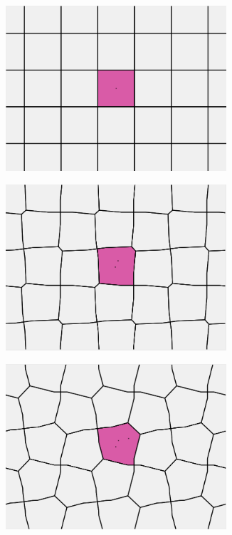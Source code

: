 \documentclass[12pt]{article}
\begin{document}
\begin{figure}[h]

  \begin{subfigure}[b]{0.323\textwidth}
    \includegraphics[width=0.9\textwidth]{s0.png}

  \end{subfigure}
  \begin{subfigure}[b]{0.323\textwidth}
    \includegraphics[width=0.9\textwidth]{s1.png}

  \end{subfigure}
  \begin{subfigure}[b]{0.323\textwidth}
    \includegraphics[width=0.9\textwidth]{s2.png}


\end{subfigure}
\end{figure}
\end{document}
